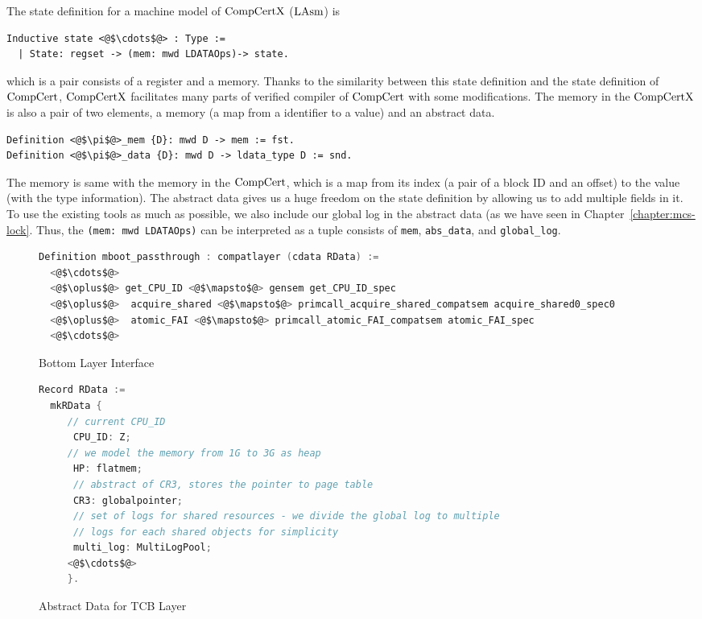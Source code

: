 The state definition for a machine model of  $\mathrm{CompCertX}$ ($\mathrm{LAsm}$) is
\begin{lstlisting}
Inductive state <@$\cdots$@> : Type :=
  | State: regset -> (mem: mwd LDATAOps)-> state.
\end{lstlisting}
which is a pair consists of  a register and a memory. 
Thanks to the similarity between this state definition and the state definition of $\mathrm{CompCert}$, 
$\mathrm{CompCertX}$ facilitates many parts of verified compiler of $\mathrm{CompCert}$ with some modifications. 
The memory in the $\mathrm{CompCertX}$ is also a pair of two elements, 
a memory (a map from a identifier to a value) and an abstract data. 
\begin{lstlisting}
Definition <@$\pi$@>_mem {D}: mwd D -> mem := fst.
Definition <@$\pi$@>_data {D}: mwd D -> ldata_type D := snd.
\end{lstlisting}
The memory is same with the memory in the $\mathrm{CompCert}$, which is a map from its index (a pair of a block ID and an offset) to 
the value (with the type information). 
The abstract data gives us a huge freedom on the state definition by allowing us to add 
multiple fields in it. 
To use the existing tools as much as possible, 
we also include our global log in the abstract data (as we have seen in Chapter~\ref{chapter:mcs-lock}.
Thus, the \lstinline$(mem: mwd LDATAOps)$ can be interpreted as a tuple consists of 
\lstinline$mem$, \lstinline$abs_data$, and \lstinline$global_log$.

\begin{figure}
\begin{lstlisting}[language=C]
Definition mboot_passthrough : compatlayer (cdata RData) :=
  <@$\cdots$@>
  <@$\oplus$@> get_CPU_ID <@$\mapsto$@> gensem get_CPU_ID_spec
  <@$\oplus$@>  acquire_shared <@$\mapsto$@> primcall_acquire_shared_compatsem acquire_shared0_spec0
  <@$\oplus$@>  atomic_FAI <@$\mapsto$@> primcall_atomic_FAI_compatsem atomic_FAI_spec
  <@$\cdots$@>
\end{lstlisting}
\caption{Bottom Layer Interface}
\label{fig:chapter:certikos:bottom-layer-interface}
\end{figure}

\begin{figure}
\begin{lstlisting}[language=C]
Record RData :=
  mkRData {
     // current CPU_ID
      CPU_ID: Z;
     // we model the memory from 1G to 3G as heap            
      HP: flatmem;     
      // abstract of CR3, stores the pointer to page table
      CR3: globalpointer;
      // set of logs for shared resources - we divide the global log to multiple
      // logs for each shared objects for simplicity   
      multi_log: MultiLogPool;     
     <@$\cdots$@>
     }.
\end{lstlisting}
\caption{Abstract Data for TCB Layer}
\label{fig:chapter:certikos:abstract-data-for-bottom-layer}
\end{figure}

